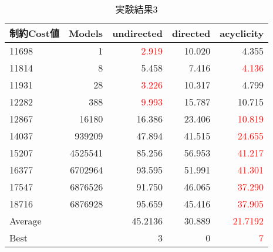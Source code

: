 \begin{table}[htbp]
  \caption{実験結果3}
  \label{cost_table}
  \centering
  \begin{tabular}{|l|r|rrr|}
    \hline
    制約Cost値    &	Models & undirected & directed & acyclicity \\
    \hline
    11698   &	1      &\textcolor{red}{2.919} &10.020 & 4.355	\\
    11814   &	8      &5.458  &7.416	& \textcolor{red}{4.136}	\\
    11931   &	28     &\textcolor{red}{3.226}&10.317	& 4.799	\\
    12282   &	388    &\textcolor{red}{9.993}&15.787	& 10.715	\\
    12867   &	16180  &16.386       &23.406	& \textcolor{red}{10.819}\\
    14037   &	939209 &47.894       &41.515	& \textcolor{red}{24.655}\\
    15207   &	4525541&85.256       &56.953	& \textcolor{red}{41.217}\\
    16377   &	6702964&93.595       &51.991	& \textcolor{red}{41.301}	\\
    17547   &	6876526&91.750       &46.065	& \textcolor{red}{37.290}	\\
    18716   &	6876928&95.659       &45.416	& \textcolor{red}{37.905}	\\
    \hline
    Average &   & 45.2136 & 30.889  & \textcolor{red}{21.7192}\\
    Best    &   & 3 & 0 & \textcolor{red}{7} \\
    \hline
  \end{tabular}
\end{table}

